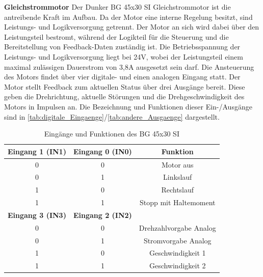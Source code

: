 \noindent\textbf{Gleichstrommotor}\newline
Der Dunker BG 45x30 SI Gleichstrommotor ist die antreibende Kraft im Aufbau. Da der Motor eine interne Regelung besitzt, sind Leistungs- und Logikversorgung getrennt. Der Motor an sich wird dabei über den Leistungsteil bestromt, während der Logikteil für die Steuerung und die Bereitstellung von Feedback-Daten zuständig ist. Die Betriebsspannung der Leistungs- und Logikversorgung liegt bei 24V, wobei der Leistungsteil einem maximal zulässigen Dauerstrom von 3,8A ausgesetzt sein darf. Die Ansteuerung des Motors findet über vier digitale- und einen analogen Eingang statt. Der Motor stellt Feedback zum aktuellen Status über drei Ausgänge bereit. Diese geben die Drehrichtung, aktuelle Störungen und die Drehgeschwindigkeit des Motors in Impulsen an. Die Bezeichnung und Funktionen dieser Ein-/Ausgänge sind in \autoref{tab:digitale_Eingaenge}/\autoref{tab:andere_Ausgaenge} dargestellt.\\
\begin{table}[H]
	\centering
		\begin{tabular}{|c|c|c|}
			\hline
			\textbf{Eingang 1 (IN1)} & \textbf{Eingang 0 (IN0)} & \textbf{Funktion}      \\ \hline
			0                        & 0                        & Motor aus              \\ \hline
			0                        & 1                        & Linkslauf              \\ \hline
			1                        & 0                        & Rechtslauf             \\ \hline
			1                        & 1                        & Stopp mit Haltemoment  \\ \hline
			\textbf{Eingang 3 (IN3)} & \textbf{Eingang 2 (IN2)} &                        \\ \hline
			0                        & 0                        & Drehzahlvorgabe Analog \\ \hline
			0                        & 1                        & Stromvorgabe Analog    \\ \hline
			1                        & 0                        & Geschwindigkeit 1      \\ \hline
			1                        & 1                        & Geschwindigkeit 2      \\ \hline
		\end{tabular}%
	\caption{Eingänge und Funktionen des BG 45x30 SI}
	\label{tab:digitale_Eingaenge}
\end{table}
